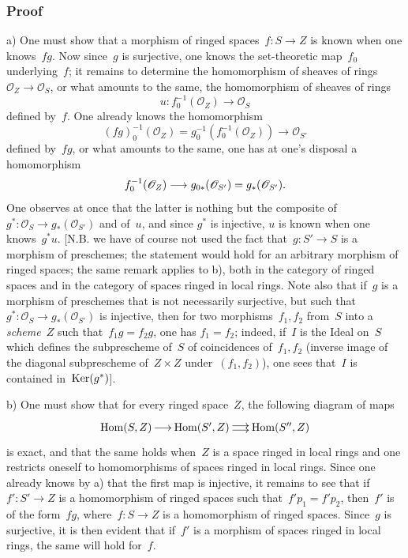 \subsubsection*{Proof} a) One must show that a morphism of ringed
spaces~$f\colon S\to Z$ is known when one
knows~$fg$. Now since~$g$ is surjective, one knows
the set-theoretic map~$f_{0}$ underlying~$f$; it remains to
determine the homomorphism of sheaves
of rings~$\mathcal{O}_{Z}\to \mathcal{O}_{S}$, or what amounts to the
same, the homomorphism
of sheaves of rings
$$
u\colon f_{0}^{-1}(\mathcal{O}_{Z})\to \mathcal{O}_{S}
$$
defined by~$f$. One already knows the homomorphism
$$
(fg)_{0}^{-1}(\mathcal{O}_{Z})=
g_{0}^{-1}(f_{0}^{-1}(\mathcal{O}_{Z}))\to \mathcal{O}_{S'}
$$
defined by~$fg$, or what amounts to the same, one has at one's
disposal a homomorphism
$$
f_{0}^{-1}(\mathcal{O}_{Z})\to
g_{0*}(\mathcal{O}_{S'})=g_*(\mathcal{O}_{S'})\quoi.
$$
One observes at once that the latter is nothing but the composite
of~$g^*\colon \mathcal{O}_{S}\to g_*(\mathcal{O}_{S'})$ and
of~$u$, and since $g^*$ is injective, $u$ is known when one
knows~$g^*u$. [N.B. we have of course not used the fact
that~$g\colon S'\to S$ is a morphism of preschemes;
the statement would hold for an arbitrary morphism of ringed
spaces; the same remark applies to b), both in the
category of ringed spaces and in the category of
spaces ringed in local rings. Note also that if~$g$ is a
morphism of preschemes that is not necessarily surjective, but
such that~$g^*\colon \mathcal{O}_{S}\to g_*(\mathcal{O}_{S'})$
is injective, then for two morphisms~$f_{1},f_{2}$ from~$S$ into a
\emph{scheme}~$Z$ such that~$f_{1}g=f_{2}g$, one has $f_{1}=f_{2}$;
indeed, if~$I$ is the Ideal on~$S$ which defines the
subprescheme of~$S$ of coincidences of~$f_{1},f_{2}$
(inverse image of the diagonal subprescheme of~$Z\times Z$
under~$(f_{1},f_{2})$), one sees that~$I$ is contained
in~$\operatorname{Ker}(g^*)$].

b) One must show that for every ringed space~$Z$, the
following diagram of maps
$$
\xymatrix@C=.5cm{\Hom(S,Z)\ar[r] & \Hom(S',Z)\ar@<2pt>[r]\ar@<-2pt>[r] &
\Hom(S'',Z)}
$$
is exact, and that the same holds when~$Z$ is a space
ringed in local rings and one restricts oneself to homomorphisms
of spaces ringed in local rings. Since one already knows by a)
that the first map is injective, it remains to see that
if~$f'\colon S'\to Z$ is a homomorphism of ringed spaces such
that~$f'p_{1}=f'p_{2}$,
then~$f'$ is of the form~$fg$, where~$f\colon S\to Z$ is a
homomorphism of ringed spaces. Since~$g$ is surjective, it is
then evident that if~$f'$ is a morphism of spaces ringed
in local rings, the same will hold for~$f$.

